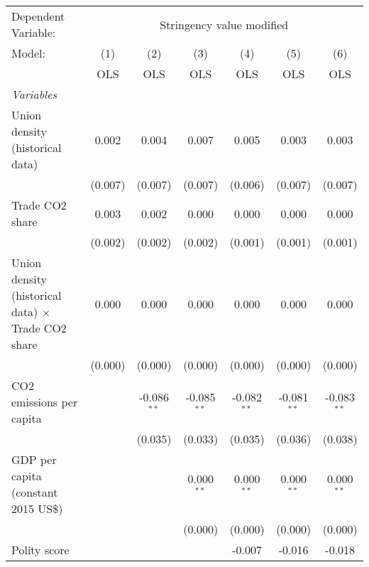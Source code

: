 
\begingroup
\centering
\begin{tabular}{lcccccc}
   \toprule
   Dependent Variable: & \multicolumn{6}{c}{Stringency value modified}\\
   Model:                                                    & (1)     & (2)           & (3)           & (4)           & (5)           & (6)\\  
                                                             &  OLS    & OLS           & OLS           & OLS           & OLS           & OLS\\  
   \midrule
   \emph{Variables}\\
   Union density (historical data)                           & 0.002   & 0.004         & 0.007         & 0.005         & 0.003         & 0.003\\   
                                                             & (0.007) & (0.007)       & (0.007)       & (0.006)       & (0.007)       & (0.007)\\   
   Trade CO2 share                                           & 0.003   & 0.002         & 0.000         & 0.000         & 0.000         & 0.000\\   
                                                             & (0.002) & (0.002)       & (0.002)       & (0.001)       & (0.001)       & (0.001)\\   
   Union density (historical data) $\times$ Trade CO2 share  & 0.000   & 0.000         & 0.000         & 0.000         & 0.000         & 0.000\\   
                                                             & (0.000) & (0.000)       & (0.000)       & (0.000)       & (0.000)       & (0.000)\\   
   CO2 emissions per capita                                  &         & -0.086$^{**}$ & -0.085$^{**}$ & -0.082$^{**}$ & -0.081$^{**}$ & -0.083$^{**}$\\   
                                                             &         & (0.035)       & (0.033)       & (0.035)       & (0.036)       & (0.038)\\   
   GDP per capita (constant 2015 US\$)                       &         &               & 0.000$^{**}$  & 0.000$^{**}$  & 0.000$^{**}$  & 0.000$^{**}$\\   
                                                             &         &               & (0.000)       & (0.000)       & (0.000)       & (0.000)\\   
   Polity score                                              &         &               &               & -0.007        & -0.016        & -0.018\\   

\end{tabular}
